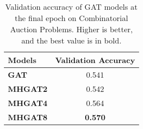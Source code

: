 \begin{table}[htb!]
    \centering
    \begin{tabular}{|l c|}
        \hline
        \textbf{Models} & \textbf{Validation Accuracy}\\
        \hline
        \textbf{GAT} & 0.541\\
        \textbf{MHGAT2} & 0.542\\
        \textbf{MHGAT4} & 0.564\\
        \textbf{MHGAT8} & \textbf{0.570}\\
        \hline
    \end{tabular}
    \caption{Validation accuracy of GAT models at the final epoch on Combinatorial Auction Problems.
    Higher is better, and the best value is in bold.}
    \label{tab:ca-validation-accuracy}
\end{table}